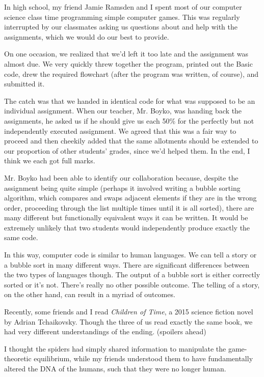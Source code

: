 In high school, my friend Jamie Ramsden and I spent most of our computer science class time programming simple computer games. This was regularly interrupted by our classmates asking us questions about and help with the assignments, which we would do our best to provide.

On one occasion, we realized that we'd left it too late and the assignment was almost due. We very quickly threw together the program, printed out the Basic code, drew the required flowchart (after the program was written, of course), and submitted it.

The catch was that we handed in identical code for what was supposed to be an individual assignment. When our teacher, Mr. Boyko, %
was handing back the assignments, he asked us if he should give us each 50\% for the perfectly but not independently executed assignment. We agreed that this was a fair way to proceed and then cheekily added that the same allotments should be extended to our proportion of other students' grades, since we'd helped them. In the end, I think we each got full marks.

Mr. Boyko had been able to identify our collaboration because, despite the assignment being quite simple (perhaps it involved writing a bubble sorting algorithm, which compares and swaps adjacent elements if they are in the wrong order, proceeding through the list multiple times until it is all sorted), there are many different but functionally equivalent ways it can be written. It would be extremely unlikely that two students would independently produce exactly the same code.

In this way, computer code is similar to human languages. We can tell a story or a bubble sort in many different ways. There are significant differences between the two types of languages though. The output of a bubble sort is either correctly sorted or it's not. There's really no other possible outcome. The telling of a story, on the other hand, can result in a myriad of outcomes.

Recently, some friends and I read \textit{Children of Time}, a 2015 science fiction novel by Adrian Tchaikovsky. Though the three of us read exactly the same book, we had very different understandings of the ending. (spoilers ahead) 

I thought the spiders had simply shared information to manipulate the game-theoretic equilibrium, while my friends understood them to have fundamentally altered the DNA of the humans, such that they were no longer human.

